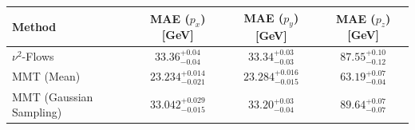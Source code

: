     \begin{tabular}{lccc}
        \toprule
        Method & MAE ($p_x$) [GeV] & MAE ($p_y$) [GeV] & MAE ($p_z$) [GeV] \\
        \midrule
        $\nu^2$-Flows & $33.36^{+0.04}_{-0.04}$ & $33.34^{+0.03}_{-0.03}$ & $87.55^{+0.10}_{-0.12}$ \\
        MMT (Mean) & $23.234^{+0.014}_{-0.021}$ & $23.284^{+0.016}_{-0.015}$ & $63.19^{+0.07}_{-0.04}$ \\
        MMT (Gaussian Sampling) & $33.042^{+0.029}_{-0.015}$ & $33.20^{+0.03}_{-0.04}$ & $89.64^{+0.07}_{-0.07}$ \\
        \bottomrule
    \end{tabular}